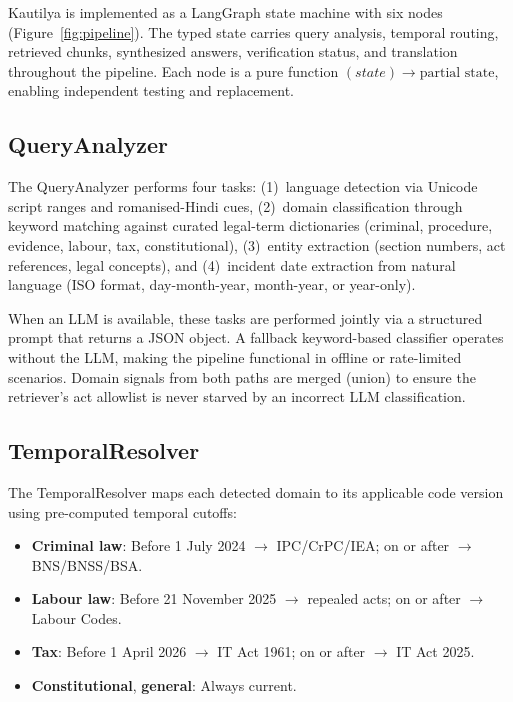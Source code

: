 \documentclass[conference]{IEEEtran}
\begin{document}
Kautilya is implemented as a LangGraph state machine with six nodes (Figure~\ref{fig:pipeline}). The typed state carries query analysis, temporal routing, retrieved chunks, synthesized answers, verification status, and translation throughout the pipeline. Each node is a pure function $(state) \rightarrow \text{partial state}$, enabling independent testing and replacement.

\subsection{QueryAnalyzer}
\label{ssec:analyzer}

The QueryAnalyzer performs four tasks: (1)~language detection via Unicode script ranges and romanised-Hindi cues, (2)~domain classification through keyword matching against curated legal-term dictionaries (criminal, procedure, evidence, labour, tax, constitutional), (3)~entity extraction (section numbers, act references, legal concepts), and (4)~incident date extraction from natural language (ISO format, day-month-year, month-year, or year-only).

When an LLM is available, these tasks are performed jointly via a structured prompt that returns a JSON object. A fallback keyword-based classifier operates without the LLM, making the pipeline functional in offline or rate-limited scenarios. Domain signals from both paths are merged (union) to ensure the retriever's act allowlist is never starved by an incorrect LLM classification.

\subsection{TemporalResolver}
\label{ssec:resolver}

The TemporalResolver maps each detected domain to its applicable code version using pre-computed temporal cutoffs:

\begin{itemize}
    \item \textbf{Criminal law}: Before 1 July 2024 $\rightarrow$ IPC/CrPC/IEA; on or after $\rightarrow$ BNS/BNSS/BSA.
    \item \textbf{Labour law}: Before 21 November 2025 $\rightarrow$ repealed acts; on or after $\rightarrow$ Labour Codes.
    \item \textbf{Tax}: Before 1 April 2026 $\rightarrow$ IT Act 1961; on or after $\rightarrow$ IT Act 2025.
    \item \textbf{Constitutional}, \textbf{general}: Always current.
\end{itemize}
\end{document}
